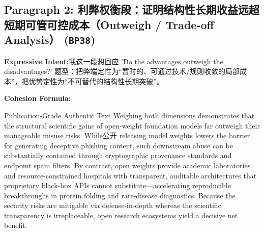 \subsection*{Paragraph 2: 利弊权衡段：证明结构性长期收益远超短期可管可控成本（Outweigh / Trade-off Analysis） (\texttt{BP38})}
\noindent\textbf{Expressive Intent:}\enspace 我这一段想回应 'Do the advantages outweigh the disadvantages?' 题型：把弊端定性为“暂时的、可通过技术/规则收敛的局部成本”，把优势定性为“不可替代的结构性长期突破”。\par
\noindent\textbf{Cohesion Formula:}\par\vspace{4pt}
\begin{ExampleBox}{Publication-Grade Authentic Text}
Weighing both dimensions demonstrates that the structural scientific gains of open-weight foundation models far outweigh their manageable misuse risks. While公开 releasing model weights lowers the barrier for generating deceptive phishing content, such downstream abuse can be substantially contained through cryptographic provenance standards and endpoint spam filters. By contrast, open weights provide academic laboratories and resource-constrained hospitals with transparent, auditable architectures that proprietary black-box APIs cannot substitute---accelerating reproducible breakthroughs in protein folding and rare-disease diagnostics. Because the security risks are mitigable via defense-in-depth whereas the scientific transparency is irreplaceable, open research ecosystems yield a decisive net benefit.
\end{ExampleBox}
